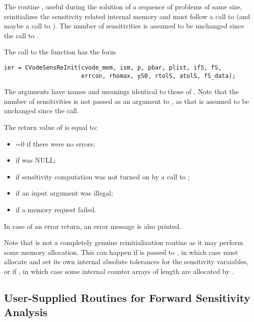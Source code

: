 The routine , useful during the solution of a sequence of problems of 
same size, reinitializes the sensitivity related internal memory 
and must follow a call to  (and maybe a call to ). 
The number  of sensitivities is assumed to be unchanged since the call to 
.

The call to the  function has the form
\begin{verbatim}
ier = CVodeSensReInit(cvode_mem, ism, p, pbar, plist, ifS, fS,
                      errcon, rhomax, yS0, rtolS, atolS, fS_data);
\end{verbatim}
The arguments have names and meanings identical to those of .
Note that the number of sensitivities  is not passed as an argument to 
, as that is assumed to be unchanged since 
the  call. 

The return value  of  is equal to: 
\begin{itemize}
\item {}=0 if there were no errors; 
\item {} if  was NULL;
\item {} if sensitivity computation was not turned on
      by a call to ;
\item {} if an input argument was illegal;
\item {} if a memory request failed.
\end{itemize}
In case of an error return, an error message is also printed.  

Note that  is not a completely genuine reinitialization
routine as it may perform some memory allocation. This can happen
if  is passed to , in which case {\cvodes}
must allocate and set its own internal absolute tolerances for the sensitivity
varaiables, or if , in which case some internal counter
arrays of length  are allocated by .

\subsection{User-Supplied Routines for Forward Sensitivity Analysis}\label{ss:user_fct_fwd}

